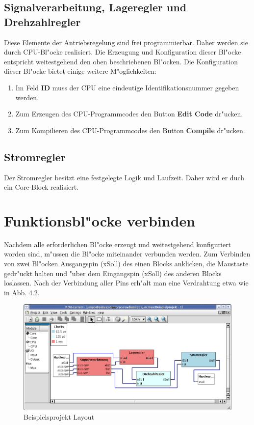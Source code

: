 \subsection{Signalverarbeitung, Lageregler und Drehzahlregler}
Diese Elemente der Antriebsregelung sind frei programmierbar. Daher werden sie durch CPU-Bl"ocke realisiert. Die Erzeugung und Konfiguration dieser Bl"ocke entspricht weitestgehend den oben beschriebenen Bl"ocken. Die Konfiguration dieser Bl"ocke bietet einige weitere M"oglichkeiten:
\begin{enumerate}
	\item Im Feld {\bf ID} muss der CPU eine eindeutige Identifikationsnummer gegeben werden.
	\item Zum Erzeugen des CPU-Programmcodes den Button {\bf Edit Code} dr"ucken.
	\item Zum Kompilieren des CPU-Programmcodes den Button {\bf Compile} dr"ucken.
\end{enumerate}

\subsection{Stromregler}
Der Stromregler besitzt eine festgelegte Logik und Laufzeit. Daher wird er duch ein Core-Block realisiert.


\section{Funktionsbl"ocke verbinden}
Nachdem alle erforderlichen Bl"ocke erzeugt und weitestgehend konfiguriert worden sind, m"ussen die Bl"ocke miteinander verbunden werden. Zum Verbinden von zwei Bl"ocken Ausgangspin (xSoll) des einen Blocks anklicken, die Maustaste gedr"uckt halten und "uber dem Eingangspin (xSoll) des anderen Blocks loslassen. Nach der Verbindung aller Pins erh"alt man eine Verdrahtung etwa wie in Abb. 4.2.
\begin{figure}[htbp]

\begin{center}

\includegraphics[width=15cm]{Bspprojekt1}
\caption{Beispielsprojekt Layout}\label{test}
\end{center}

\end{figure}

